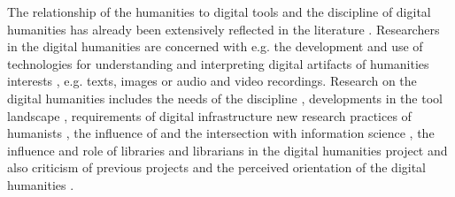 \documentclass[12pt, a4paper, titlepage, oneside, abstract=true, toc=listof, toc=bibliography, BCOR=1cm]{scrreprt}
\begin{document}
The relationship of the humanities to digital tools and the discipline of digital humanities has already been extensively reflected in the literature \citep[e.g.][]{Anthony2013, Barker2012, Berry2012, Borgman2009, Brian2020, Cunningham2010, Engerer2020, Given2018, Koltay2016, McGillivray2020, Neuefeind2020, Rosenblum2016, Zundert2012, Unsworth2000}. Researchers in the digital humanities are concerned with e.g. the development and use of technologies for understanding and interpreting digital artifacts of humanities interests \citep{Given2018}, e.g. texts, images or audio and video recordings. Research on the digital humanities includes the needs of the discipline \citep{Arthur2009, Berry2012, Borgman2009, Neuefeind2020, Rosenblum2016}, developments in the tool landscape \citep{Anthony2013}, requirements of digital infrastructure \citep{Buddenbohm2017} new research practices of humanists \citep{Given2018}, the influence of and the intersection with information science \citep{Engerer2020, McGillivray2020}, the influence and role of libraries and librarians in the digital humanities project \citep{Cunningham2010, Koltay2016, Warwick2008} and also criticism of previous projects and the perceived orientation of the digital humanities \citep{Barker2012, Zundert2012}.

\end{document}
